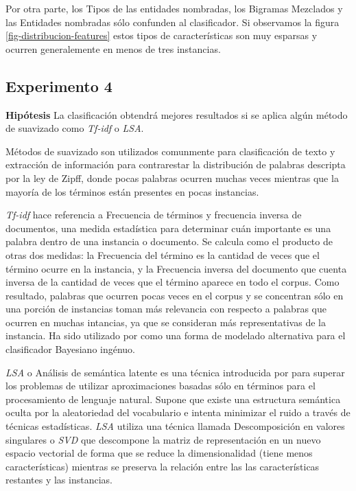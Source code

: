 Por otra parte, los Tipos de las entidades nombradas, los Bigramas Mezclados y las Entidades nombradas sólo confunden al clasificador. Si observamos la figura \ref{fig-distribucion-features} estos tipos de características son muy esparsas y ocurren generalemente en menos de tres instancias.

\subsection{Experimento 4}
\vspace{3 mm}
\textbf{Hipótesis} La clasificación obtendrá mejores resultados si se aplica algún método de suavizado como \textit{Tf-idf} o \textit{LSA}.
\vspace{3 mm}

Métodos de suavizado son utilizados comunmente para clasificación de texto y extracción de información para contrarestar la distribución de palabras descripta por la ley de Zipff, donde pocas palabras ocurren muchas veces mientras que la mayoría de los términos están presentes en pocas instancias.

\textit{Tf-idf} hace referencia a Frecuencia de términos y frecuencia inversa de documentos, una medida estadística para determinar cuán importante es una palabra dentro de una instancia o documento. Se calcula como el producto de otras dos medidas: la Frecuencia del término es la cantidad de veces que el término ocurre en la instancia, y la Frecuencia inversa del documento que cuenta inversa de la cantidad de veces que el término aparece en todo el corpus. Como resultado, palabras que ocurren pocas veces en el corpus y se concentran sólo en una porción de instancias toman más relevancia con respecto a palabras que ocurren en muchas intancias, ya que se consideran más representativas de la instancia. Ha sido utilizado por \citet{tackling-mnb} como una forma de modelado alternativa para el clasificador Bayesiano ingénuo.

\textit{LSA} o Análisis de semántica latente es una técnica introducida por \citet{lsa} para superar los problemas de utilizar aproximaciones basadas sólo en términos para el procesamiento de lenguaje natural. Supone que existe una estructura semántica oculta por la aleatoriedad del vocabulario e intenta minimizar el ruido a través de técnicas estadísticas. \textit{LSA} utiliza una técnica llamada Descomposición en valores singulares o \textit{SVD} que descompone la matriz de representación en un nuevo espacio vectorial de forma que se reduce la dimensionalidad (tiene menos características) mientras se preserva la relación entre las las características restantes y las instancias.


